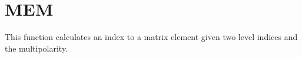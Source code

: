 \section{MEM}
\label{sect:mem}

\noindent This function calculates an index to a matrix element given two
level indices and the multipolarity.\\

